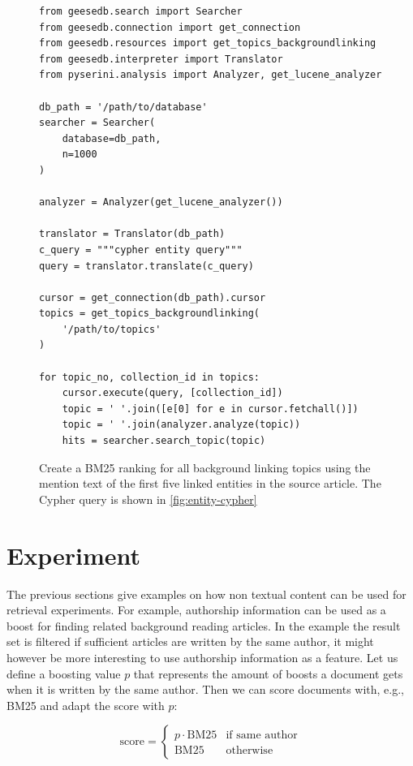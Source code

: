 \begin{figure}
	\begin{verbatim}
from geesedb.search import Searcher
from geesedb.connection import get_connection
from geesedb.resources import get_topics_backgroundlinking
from geesedb.interpreter import Translator
from pyserini.analysis import Analyzer, get_lucene_analyzer

db_path = '/path/to/database'
searcher = Searcher(
    database=db_path,
    n=1000
)

analyzer = Analyzer(get_lucene_analyzer())

translator = Translator(db_path)
c_query = """cypher entity query"""
query = translator.translate(c_query)

cursor = get_connection(db_path).cursor
topics = get_topics_backgroundlinking(
    '/path/to/topics'
)

for topic_no, collection_id in topics:
    cursor.execute(query, [collection_id])
    topic = ' '.join([e[0] for e in cursor.fetchall()]) 
    topic = ' '.join(analyzer.analyze(topic))
    hits = searcher.search_topic(topic)
	\end{verbatim}
	\caption{Create a BM25 ranking for all background linking topics using the mention text of the first five linked entities in the source article. The Cypher query is shown in \cref{fig:entity-cypher}}
	\label{fig:entities-code}
\end{figure}

\section{Experiment}

The previous sections give examples on how non textual content can be used for retrieval experiments. For example, authorship information can be used as a boost for finding related background reading articles. In the example the result set is filtered if sufficient articles are written by the same author, it might however be more interesting to use authorship information as a feature. Let us define a boosting value $p$ that represents the amount of boosts a document gets when it is written by the same author. Then we can score documents with, e.g., BM25 and adapt the score with $p$:

\begin{equation}
	\text{score} = \begin{cases}
		p \cdot \text{BM}25  & \text{if same author} \\
		\text{BM}25 & \text{otherwise}
	\end{cases}
\end{equation}

